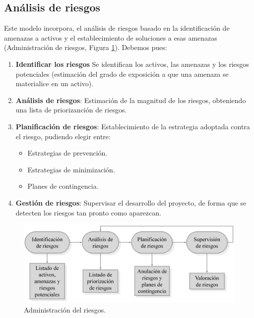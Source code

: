 \subsection{Análisis de riesgos}
Este modelo incorpora, el análisis de riesgos basado en la identificación de amenazas a activos y el establecimiento de soluciones a esas amenazas (Administración de riesgos, Figura \ref{fig:administracionRiesgo}). Debemos pues:
\begin{enumerate}
   \item \textbf{Identificar los riesgos} Se identifican los activos, las amenazas y los riesgos potenciales (estimación del grado de exposición a que una amenaza se materialice en un activo). %
   
   \item \textbf{Análisis de riesgos}: Estimación de la magnitud de los riesgos, obteniendo una lista de priorizanción de riesgos. 
   
   \item \textbf{Planificación de riesgos}: 
   Establecimiento de la estrategia adoptada contra el riesgo, pudiendo elegir entre:
   \begin{itemize}
      \item Estrategias de prevención.
      \item Estrategias de minimización.
      \item Planes de contingencia.
   \end{itemize}
   \item \textbf{Gestión de riesgos}: Supervisar el desarrollo del proyecto, de forma que se detecten los riesgos tan pronto como aparezcan.
\end{enumerate}

\begin{figure}[H]
  \centering
  \includegraphics[width=0.7\linewidth]{Resources/administracionRiesgo.jpg}
  \caption{Administración del riesgos.}
  \label{fig:administracionRiesgo}
\end{figure}


